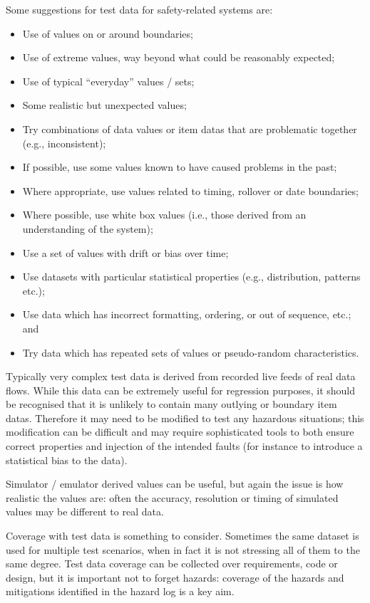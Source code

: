 Some suggestions for test data for safety-related systems are:
\begin{itemize}
  \item Use of values on or around boundaries;
  \item Use of extreme values, way beyond what could be reasonably expected;
  \item Use of typical ``everyday'' values / sets;
  \item Some realistic but unexpected values;
  \item Try combinations of data values or \glspl{item data} that are problematic together (e.g., inconsistent);
  \item If possible, use some values known to have caused problems in the past;
  \item Where appropriate, use values related to timing, rollover or date boundaries;
  \item Where possible, use white box values (i.e., those derived from an understanding of the system);
  \item Use a set of values with drift or bias over time;
  \item Use \glspl{dataset} with particular statistical properties (e.g., distribution, patterns etc.);
  \item Use data which has incorrect formatting, ordering, or out of sequence, etc.; and
  \item Try data which has repeated sets of values or pseudo-random characteristics.
\end{itemize}
Typically very complex test data is derived from recorded live feeds of real data flows. While this data can be extremely useful for regression purposes, it should be recognised that it is unlikely to contain many outlying or boundary \glspl{item data}. Therefore it may need to be modified to test any hazardous situations; this modification can be difficult and may require sophisticated tools to both ensure correct properties and injection of the intended faults (for instance to introduce a statistical bias to the data).

Simulator / emulator derived values can be useful, but again the issue is how realistic the values are: often the \gls{accuracy}, \gls{resolution} or timing of simulated values may be different to real data.

Coverage with test data is something to consider. Sometimes the same \gls{dataset} is used for multiple test scenarios, when in fact it is not stressing all of them to the same degree. Test data coverage can be collected over requirements, code or design, but it is important not to forget hazards: coverage of the hazards and mitigations identified in the \gls{hazard log} is a key aim. 

